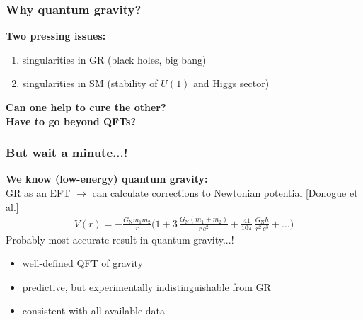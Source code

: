 \documentclass[]{beamer}  %
\newcommand\GNewton{ G_{\scriptscriptstyle{\mathrm{N}}}{} }
\begin{document}
\addtocounter{framenumber}{-1}
\begin{frame}
  \frametitle{Why quantum gravity?}
  \textbf{Two pressing issues:}
  \begin{enumerate}
    \item singularities in GR (black holes, big bang)
      \hspace{2cm}
    \item singularities in SM (stability of $U(1)$ and Higgs sector)
  \end{enumerate}
  \vfill
  \begin{center}
    \fontsize{12pt}{7.2}\selectfont
    \textbf{ Can one help to cure the other? } \\[15pt]
    \textbf{ Have to go beyond QFTs? }
  \end{center}
\end{frame}



\begin{frame}
  \frametitle{But wait a minute...!}
  \textbf{We know (low-energy) quantum gravity:}\\[5pt]
  GR as an EFT $\rightarrow$ can calculate corrections to Newtonian potential [Donogue et al.]
  \begin{align*}
    \boxed{
      V(r) = -\frac{\GNewton m_1 m_2}{r}
      \bigg(
        1
        + 3 \, \frac{\GNewton (m_1 + m_2)}{r \, c^2}
        + \frac{41}{10 \pi} \, \frac{\GNewton \hbar}{r^2 \, c^3}
        + \dots
      \bigg)
    }
  \end{align*}
  \hfill Probably most accurate result in quantum gravity...!
  \pause
  \vfill
  \begin{itemize}
    \item well-defined QFT of gravity\\[5pt]
    \item predictive, but experimentally indistinguishable from GR\\[5pt]
    \item consistent with all available data
  \end{itemize}
\end{frame}
\end{document}
